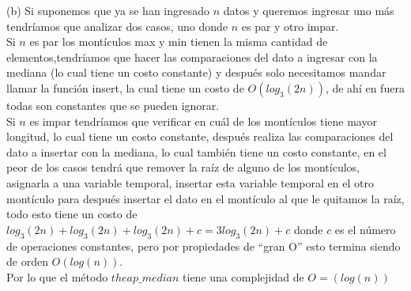 \documentclass[11pt]{article}
\begin{document}
\begin{enumerate}
(b) Si suponemos que ya se han ingresado $n$ datos y queremos ingresar uno más tendríamos que analizar dos casos, uno donde $n$ es par y otro impar.\\
Si  $n$ es par los montículos max y min tienen la misma cantidad de elementos,tendríamos que hacer las comparaciones del dato a ingresar con la mediana (lo cual tiene un costo constante) y después solo necesitamos mandar llamar la función insert, la cual tiene un costo de $O(log_3 (2n))$, de ahí en fuera todas son constantes que se pueden ignorar. 
\\
Si $n$ es impar tendríamos que verificar en cuál de los montículos tiene mayor longitud, lo cual tiene un costo constante, después realiza las comparaciones del dato a insertar con la mediana, lo cual también tiene un costo constante, en el peor de los casos tendrá que remover la raíz de alguno de los montículos, asignarla a una variable temporal, insertar esta variable temporal en el otro montículo para después insertar el dato en el montículo al que le quitamos la raíz, todo esto tiene un costo de $log_3(2n)+log_3(2n)+log_3(2n)+c=3log_3(2n)+c$ donde $c$ es el número de operaciones constantes, pero por propiedades de “gran O” esto termina siendo de orden $O(log(n))$.
\\ 
Por lo que el método $theap\_median$ tiene una complejidad de $O=(log(n))$

\end{enumerate}
\end{document}
